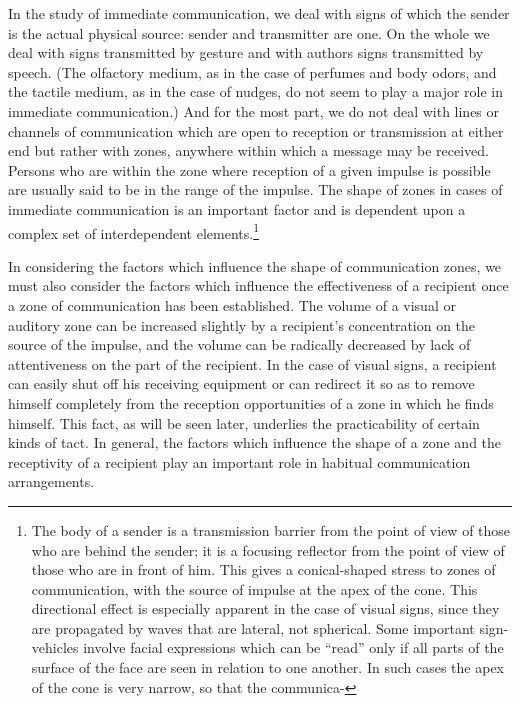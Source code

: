 \documentclass[twoside,symmetric,nobib,justified]{tufte-book}
\begin{document}
In the study of immediate communication, we deal with signs of which the
sender is the actual physical source: sender and transmitter are one. On
the whole we deal with signs transmitted by gesture and with authors
signs transmitted by speech. (The olfactory medium, as in the case of
perfumes and body odors, and the tactile medium, as in the case of
nudges, do not seem to play a major role in immediate communication.)
And for the most part, we do not deal with lines or channels of
communication which are open to reception or transmission at either end
but rather with zones, anywhere within which a message may be received.
Persons who are within the zone where reception of a given impulse is
possible are usually said to be in the range of the impulse. The shape
of zones in cases of immediate communication is an important factor and
is dependent upon a complex set of interdependent elements.\footnote{The
  body of a sender is a transmission barrier from the point of view of
  those who are behind the sender; it is a focusing reflector from the
  point of view of those who are in front of him. This gives a
  conical-shaped stress to zones of communication, with the source of
  impulse at the apex of the cone. This directional effect is especially
  apparent in the case of visual signs, since they are propagated by
  waves that are lateral, not spherical. Some important
  sign-vehicles involve facial expressions which can be ``read'' only if
  all parts of the surface of the face are seen in relation to one
  another. In such cases the apex of the cone is very narrow, so that
  the communica-}

\enlargethispage{\baselineskip}

In considering the factors which influence the shape of communication
zones, we must also consider the factors which influence the
effectiveness of a recipient once a zone of communication has been
established. The volume of a visual or auditory zone can be increased
slightly by a recipient's concentration on the source of the impulse,
and the volume can be radically decreased by lack of attentiveness on
the part of the recipient. In the case of visual signs, a recipient can
easily shut off his receiving equipment or can redirect it so as to
remove himself completely from the reception opportunities of a zone in
which he finds himself. This fact, as will be seen later, underlies the
practicability of certain kinds of tact. In general, the factors which
influence the shape of a zone and the receptivity of a recipient play an
important role in habitual communication arrangements.
\end{document}
